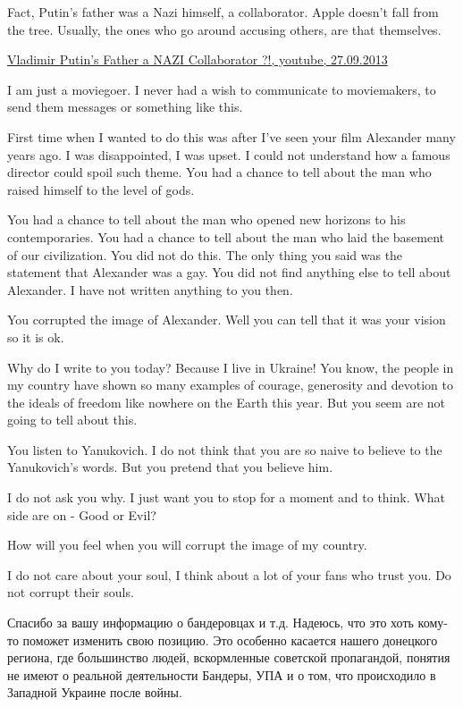 \begin{itemize}
\begin{itemize}
Fact, Putin's father was a Nazi himself, a collaborator. Apple doesn't fall
from the tree. Usually, the ones who go around accusing others, are that
themselves.

\href{https://www.youtube.com/watch?v=ACoJKdNKX2A}{%
Vladimir Putin's Father a NAZI Collaborator ?!, youtube, 27.09.2013%
}

\end{itemize} %


I am just a moviegoer. I never had a wish to communicate to moviemakers, to
send them messages or something like this.

First time when I wanted to do this was after I've seen your film Alexander
many years ago. I was disappointed, I was upset. I could not understand how a
famous director could spoil such theme. You had a chance to tell about the man
who raised himself to the level of gods.

You had a chance to tell about the man who opened new horizons to his
contemporaries. You had a chance to tell about the man who laid the basement of
our civilization. You did not do this. The only thing you said was the
statement that Alexander was a gay. You did not find anything else to tell
about Alexander. I have not written anything to you then.

You corrupted the image of Alexander. Well you can tell that it was your vision
so it is ok.

Why do I write to you today? Because I live in Ukraine! You know, the people in
my country have shown so many examples of courage, generosity and devotion to
the ideals of freedom like nowhere on the Earth this year. But you seem are not
going to tell about this.

You listen to Yanukovich. I do not think that you are so naive to believe to
the Yanukovich's words. But you pretend that you believe him.

I do not ask you why. I just want you to stop for a moment and to think. What
side are on - Good or Evil?

How will you feel when you will corrupt the image of my country.

I do not care about your soul, I think about a lot of your fans who trust you.
Do not corrupt their souls.

\begin{itemize} %

Спасибо за вашу информацию о бандеровцах и т.д. Надеюсь, что это хоть кому-то
поможет изменить свою позицию. Это особенно касается нашего донецкого региона,
где большинство людей, вскормленные советской пропагандой, понятия не имеют о
реальной деятельности Бандеры, УПА и о том, что происходило в Западной Украине
после войны.



\end{itemize}
\end{itemize}
